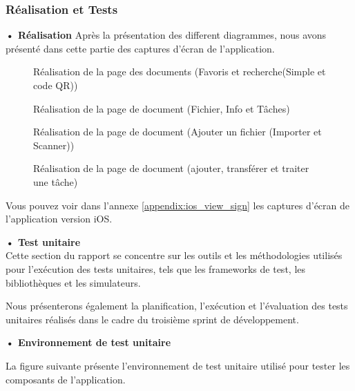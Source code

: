 \subsubsection{Réalisation et Tests}
\textbf{•	Réalisation }
Après la présentation des different diagrammes, nous avons présenté dans cette partie des captures d'écran de l'application.

\begin{figure}[H]
  \centering
  \caption{Réalisation de la page des documents (Favoris et recherche(Simple et code QR))}
  \label{fig:realisation_documents1}
\end{figure}

\begin{figure}[H]
  \centering
  \caption{Réalisation de la page de document (Fichier, Info et Tâches)}
  \label{fig:realisation_documents2}
\end{figure}

\begin{figure}[H]
  \centering
  \caption{Réalisation de la page de document (Ajouter un fichier (Importer et Scanner))}
  \label{fig:realisation_documents3}
\end{figure}

\begin{figure}[H]
  \centering
  \caption{Réalisation de la page de document (ajouter, transférer et traiter une tâche)}
  \label{fig:realisation_documents4}
\end{figure}

Vous pouvez voir dans l'annexe \ref{appendix:ios_view_sign} les captures d'écran de l'application version iOS.

\textbf{•	Test unitaire} \\
Cette section du rapport se concentre sur les outils et les méthodologies utilisés pour l'exécution des tests unitaires, tels que les frameworks de test, les bibliothèques et les simulateurs.

Nous présenterons également la planification, l'exécution et l'évaluation des tests unitaires réalisés dans le cadre du troisième sprint de développement.

\textbf{•	Environnement de test unitaire}

La figure suivante présente l'environnement de test unitaire utilisé pour tester les composants de l'application.

